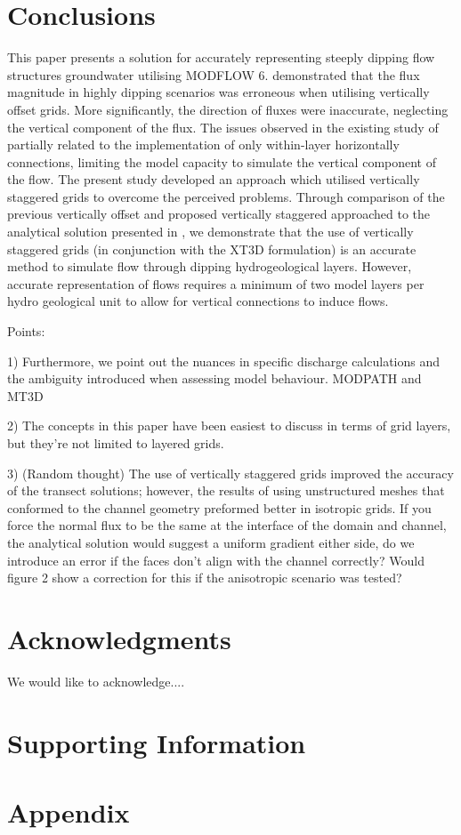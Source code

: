 \documentclass{article}
\begin{document}
\section{Conclusions}

This paper presents a solution for accurately representing steeply dipping flow structures groundwater utilising MODFLOW 6. \citep{bardot2022} demonstrated that the flux magnitude in highly dipping scenarios was erroneous when utilising vertically offset grids. More significantly, the direction of fluxes were inaccurate, neglecting the vertical component of the flux. The issues observed in the existing study of \citep{bardot2022} partially related to the implementation of only within-layer horizontally connections, limiting the model capacity to simulate the vertical component of the flow. The present study developed an approach which utilised vertically staggered grids \cite{modflow6gwf} to overcome the perceived problems. Through comparison of the previous vertically offset and proposed vertically staggered approached to the analytical solution presented in \citep{bardot2022}, we demonstrate that the use of vertically staggered grids (in conjunction with the XT3D formulation) is an accurate method to simulate flow through dipping hydrogeological layers. However, accurate representation of flows requires a minimum of two model layers per hydro geological unit to allow for vertical connections to induce flows. 

Points:

1) Furthermore, we point out the nuances in specific discharge calculations and the ambiguity introduced when assessing model behaviour.  MODPATH and MT3D

2) The concepts in this paper have been easiest to discuss in terms of grid layers, but they're not limited to layered grids.

3) (Random thought) The use of vertically staggered grids improved the accuracy of the transect solutions; however, the results of \citep{bardot2022} using unstructured meshes that conformed to the channel geometry preformed better in isotropic grids. If you force the normal flux to be the same at the interface of the domain and channel, the analytical solution would suggest a uniform gradient either side, do we introduce an error if the faces don't align with the channel correctly?  Would figure 2 show a correction for this if the anisotropic scenario was tested?

\section{Acknowledgments}
We would like to acknowledge....

\section{Supporting Information}

\section{Appendix}


\end{document}
